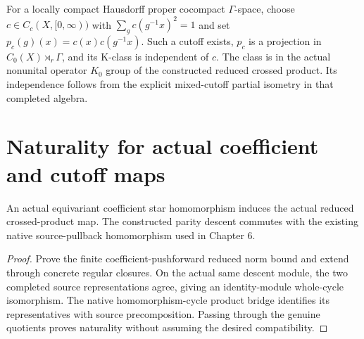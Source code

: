 \begin{definition}\label{def:cutoff-projection}
\leanok
For a locally compact Hausdorff proper cocompact $\Gamma$-space,
choose $c\in C_c(X,[0,\infty))$ with $\sum_g c(g^{-1}x)^2=1$ and set
$p_c(g)(x)=c(x)c(g^{-1}x)$. Such a cutoff exists, $p_c$ is a projection
in $C_0(X)\rtimes_r\Gamma$, and its K-class is independent of $c$.
The class is in the actual nonunital operator $K_0$ group of the
constructed reduced crossed product. Its independence follows from
the explicit mixed-cutoff partial isometry in that completed algebra.
\end{definition}


\section{Naturality for actual coefficient and cutoff maps}

\begin{proposition}\label{prop:descent-source-naturality}
\leanok
An actual equivariant coefficient star homomorphism induces the actual
reduced crossed-product map. The constructed parity descent commutes with the
existing native source-pullback homomorphism used in Chapter 6.
\end{proposition}
\begin{proof}
\leanok
Prove the finite coefficient-pushforward reduced norm bound and extend
through concrete regular closures. On the actual same descent module, the two
completed source representations agree, giving an identity-module whole-cycle
isomorphism. The native homomorphism-cycle product bridge identifies its
representatives with source precomposition. Passing through the genuine
quotients proves naturality without assuming the desired compatibility.
\end{proof}


